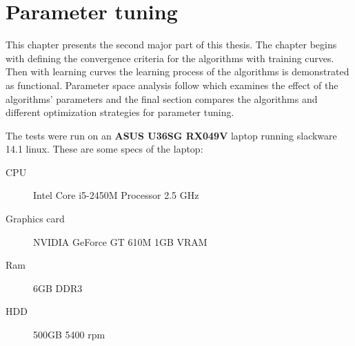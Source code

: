 
\chapter{Parameter tuning}\label{cha:param}

This chapter presents the second major part of this thesis. The chapter begins with defining the convergence criteria for the algorithms with training curves. Then with learning curves the learning process of the algorithms is demonstrated as functional. Parameter space analysis follow which examines the effect of the algorithms' parameters and the final section compares the algorithms and different optimization strategies for parameter tuning.


The tests were run on an \textbf{ASUS U36SG RX049V} laptop running slackware 14.1 linux.  These are some specs of the laptop:

\begin{description}
    \item[CPU] Intel Core i5-2450M Processor 2.5 GHz
    \item[Graphics card] NVIDIA GeForce GT 610M 1GB VRAM
    \item[Ram] 6GB DDR3
    \item[HDD] 500GB 5400 rpm
\end{description}



\newpage


\newpage


\newpage


\newpage


\newpage

